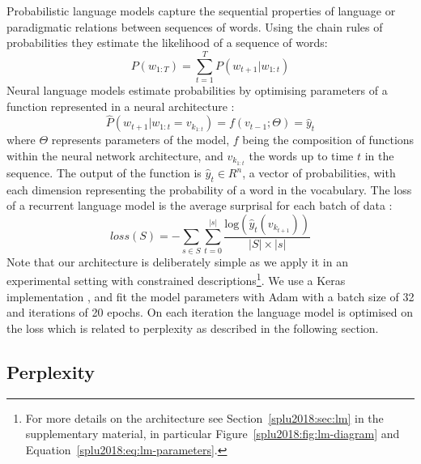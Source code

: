 Probabilistic language models capture the sequential properties of language or paradigmatic relations between sequences of words. Using the chain rules of probabilities they estimate the likelihood of a sequence of words: %
\begin{equation}\label{splu2018:eq:lm}
P(w_{1:T}) = \sum_{t=1}^{T}{P(w_{t+1} | w_{1:t})}
\end{equation}
\noindent Neural language models estimate %
probabilities by optimising parameters of a function represented in a neural architecture
\cite{bengio2003neural}:
\begin{equation}\label{splu2018:eq:nnlm}
{\hat{P}(w_{t+1}| w_{1:t} = v_{k_{1:t}})} = f(v_{t-1};\Theta) = \hat{y}_{t}
\end{equation}
\noindent where $\Theta$ represents parameters of the model, $f$ being the composition of
functions within the neural network architecture, and $v_{k_{1:t}}$ the words up to time $t$ in the sequence. The output of the function is $\hat{y}_{t} \in R^{n}$, a vector of %
probabilities, with each dimension representing the probability of a word in the vocabulary.
The loss of a recurrent language model is the average surprisal for each batch of data \cite{graves2013speech,mikolov2010recurrent}:
\begin{equation}\label{splu2018:eq:rnnloss}
loss(S) = -\sum_{s \in S} \sum_{t = 0}^{|s|} \frac{\text{log}(\hat{y}_{t}(v_{k_{t+1}}))}{|S| \times |s|}
\end{equation}
\noindent Note that our architecture is deliberately simple as we apply it in an experimental setting with constrained descriptions\footnote{For more details on the architecture see Section~\ref{splu2018:sec:lm}  in the supplementary material, in particular Figure~\ref{splu2018:fig:lm-diagram} and Equation~\ref{splu2018:eq:lm-parameters}.}.
We use a Keras implementation \cite{chollet2015keras}, and fit the model parameters with Adam \cite{kingma2014adam} 
with a batch size of 32 and iterations of 20 epochs. On each iteration the language model is optimised on the loss which is related to perplexity as described in the following section.




\subsection{Perplexity}

